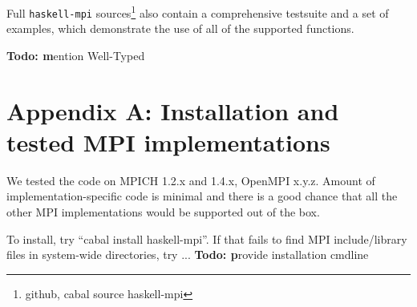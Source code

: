 \documentclass{tmr}
\newcommand{\Todo}[1]{{\textbf{Todo: #1}}}
\begin{document}
Full \verb|haskell-mpi| sources\footnote{github, cabal source
  haskell-mpi} also contain a comprehensive testsuite and a set of
examples, which demonstrate the use of all of the supported functions.

\Todo mention Well-Typed

\section{Appendix A: Installation and tested MPI implementations}
\label{appendix-A}
We tested the code on MPICH 1.2.x and 1.4.x, OpenMPI x.y.z. Amount of implementation-specific code is minimal and there is a good chance that all the other MPI implementations would be supported out of the box.

To install, try ``cabal install haskell-mpi''. If that fails to find MPI include/library files in system-wide directories, try ...
\Todo provide installation cmdline


\end{document}

